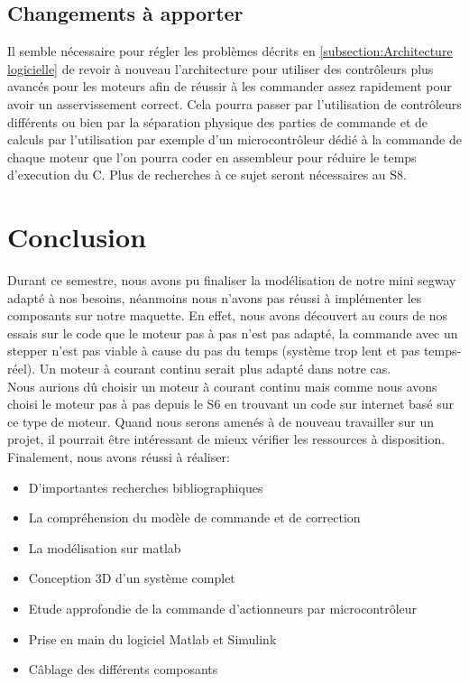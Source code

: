 \documentclass[oneside,a4paper,12pt]{article}
\begin{document}
	\subsection{Changements à apporter}
	
	Il semble nécessaire pour régler les problèmes décrits en \ref{subsection:Architecture logicielle} de revoir à nouveau l'architecture pour utiliser des contrôleurs plus avancés pour les moteurs afin de réussir à les commander assez rapidement pour avoir un asservissement correct. Cela pourra passer par l'utilisation de contrôleurs différents ou bien par la séparation physique des parties de commande et de calculs par l'utilisation par exemple d'un microcontrôleur dédié à la commande de chaque moteur que l'on pourra coder en assembleur pour réduire le temps d'execution du C. Plus de recherches à ce sujet seront nécessaires au S8.
	
	
	\newpage
	
	\section{Conclusion}
	Durant ce semestre, nous avons pu finaliser la modélisation de notre mini segway adapté à nos besoins, néanmoins nous n’avons pas réussi à implémenter les composants sur notre maquette. En effet, nous avons découvert au cours de nos essais sur le code que le moteur pas à pas n’est pas adapté, la commande avec un stepper n’est pas viable à cause du pas du temps (système trop lent et pas temps-réel). Un moteur à courant continu serait plus adapté dans notre cas.\\
	
	Nous aurions dû choisir un moteur à courant continu mais comme nous avons choisi le moteur pas à pas depuis le S6 en trouvant un code sur internet basé sur ce type de moteur.
	Quand nous serons amenés à de nouveau travailler sur un projet, il pourrait être intéressant de mieux vérifier les ressources à disposition.\\
	
	Finalement, nous avons réussi à réaliser:
	\begin{itemize}
		\item D’importantes recherches bibliographiques
		\item La compréhension du modèle de commande et de correction
		\item La modélisation sur matlab
		\item Conception 3D d'un système complet
		\item Etude approfondie de la commande d'actionneurs par microcontrôleur
		\item Prise en main du logiciel Matlab et Simulink
		\item Câblage des différents composants 
	\end{itemize}
\end{document}
